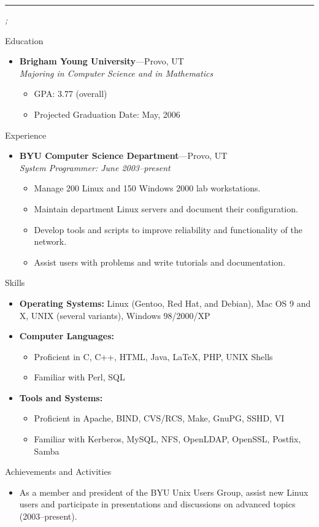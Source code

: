 \documentclass[11pt,oneside]{article}
\newcommand{\name}{}
\newcommand{\addr}{}
\newcommand{\phone}{}
\newcommand{\email}{}
\newcommand{\bigname}[1]{
	\begin{center}\fontfamily{phv}\selectfont\Huge\scshape#1\end{center}
}
\newenvironment{ressection}[1]{
	\vspace{4pt}
	{\fontfamily{phv}\selectfont\Large#1}
	\begin{itemize}
	\vspace{3pt}
}{
	\end{itemize}
}
\newcommand{\resitem}[1]{
	\vspace{-4pt}
	\item \begin{flushleft} #1 \end{flushleft}
}
\newcommand{\ressubitem}[1]{
	\vspace{-1pt}
	\item \begin{flushleft} #1 \end{flushleft}
}
\newcommand{\resbigitem}[3]{
	\vspace{-5pt}
	\item
	\textbf{#1}---#2 \\
	\textit{#3}
}
\newenvironment{ressubsec}[3]{
	\resbigitem{#1}{#2}{#3}
	\vspace{-2pt}
	\begin{itemize}
}{
	\end{itemize}
}
\newenvironment{reslist}[1]{
	\resitem{\textbf{#1}}
	\vspace{-5pt}
	\begin{itemize}
}{
	\end{itemize}
}
\begin{document}
 \selectfont

\bigname{\name}

\vspace{-8pt} \rule{\textwidth}{1pt}

\vspace{-1pt} {\small\itshape \addr \hfill \phone; \email}

\vspace{8 pt}




\begin{ressection}{Education}

	\begin{ressubsec}{Brigham Young University}{Provo, UT}{Majoring in Computer Science and in Mathematics}
		\ressubitem{GPA: 3.77 (overall)}
		\ressubitem{Projected Graduation Date: May, 2006}
	\end{ressubsec}

\end{ressection}


\begin{ressection}{Experience}

	\begin{ressubsec}{BYU Computer Science Department}{Provo, UT}{System Programmer: June 2003--present}
		\ressubitem{Manage 200 Linux and 150 Windows 2000 lab workstations.}
		\ressubitem{Maintain department Linux servers and document their configuration.}
		\ressubitem{Develop tools and scripts to improve reliability and functionality of the network.}
		\ressubitem{Assist users with problems and write tutorials and documentation.}
	\end{ressubsec}

\end{ressection}


\begin{ressection}{Skills}

	\resitem{\textbf{Operating Systems:} Linux (Gentoo, Red Hat, and Debian), Mac OS 9 and X, UNIX (several variants), Windows 98/2000/XP}

	\begin{reslist}{Computer Languages:}

		\ressubitem{Proficient in C, C++, HTML, Java, \LaTeX, PHP, UNIX Shells}

		\ressubitem{Familiar with Perl, SQL}

	\end{reslist}

	\begin{reslist}{Tools and Systems:}

		\ressubitem{Proficient in Apache, BIND, CVS/RCS, Make, GnuPG, SSHD, VI}

		\ressubitem{Familiar with Kerberos, MySQL, NFS, OpenLDAP, OpenSSL, Postfix, Samba}

	\end{reslist}


\end{ressection}


\begin{ressection}{Achievements and Activities}

	\resitem{As a member and president of the BYU Unix Users Group, assist new Linux users and participate in presentations and discussions on advanced topics (2003--present).}

\end{ressection}
\end{document}
